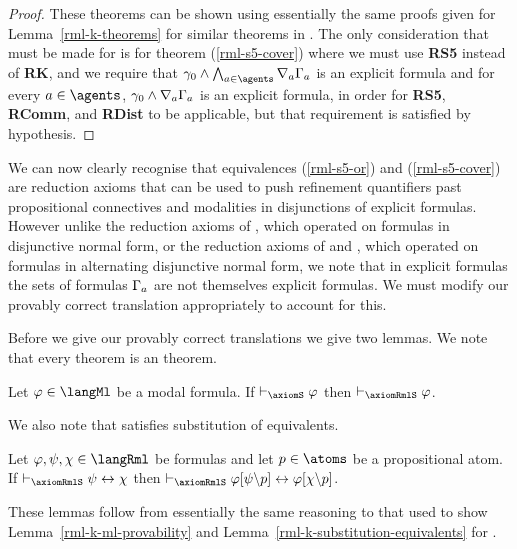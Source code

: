 \begin{proof}
These theorems can be shown using essentially the same proofs given for Lemma~\ref{rml-k-theorems} for similar theorems in \axiomRmlK{}.
The only consideration that must be made for \axiomRmlS{} is for theorem (\ref{rml-s5-cover}) where we must use {\bf RS5} instead of {\bf RK}, 
and we require that $\gamma_0 \land \bigwedge_{\agentA \in \agents} \coversA \Gamma_\agentA$ is an explicit formula and for every $\agentA \in \agents$, $\gamma_0 \land \nabla_{a} \Gamma_a$ is an explicit formula, in order for {\bf RS5}, {\bf RComm}, and {\bf RDist} to be applicable, but that requirement is satisfied by hypothesis.
\end{proof}

We can now clearly recognise that equivalences (\ref{rml-s5-or}) and (\ref{rml-s5-cover}) are reduction axioms that can be used to push refinement quantifiers past propositional connectives and modalities in disjunctions of explicit formulas.
However unlike the reduction axioms of \logicRmlK{}, which operated on formulas in disjunctive normal form, or the reduction axioms of \logicRmlKFF{} and \logicRmlKD{}, which operated on formulas in alternating disjunctive normal form, we note that in explicit formulas the sets of formulas $\Gamma_a$ are not themselves explicit formulas.
We must modify our provably correct translation appropriately to account for this.

Before we give our provably correct translations we give two lemmas.
We note that every \axiomS{} theorem is an \axiomRmlS{} theorem.

\begin{lemma}\label{rml-s5-ml-provability}
Let $\phi \in \langMl$ be a modal formula.
If $\proves_\axiomS \phi$ then $\proves_\axiomRmlS \phi$.
\end{lemma}

We also note that \axiomRmlS{} satisfies substitution of equivalents.

\begin{lemma}\label{rml-s5-substitution-equivalents}
Let $\phi, \psi, \chi \in \langRml$ be formulas and let $\atomP \in \atoms$ be a propositional atom.
If $\proves_\axiomRmlS \psi \iff \chi$ then $\proves_\axiomRmlS \phi[\psi\backslash\atomP] \iff \phi[\chi\backslash\atomP]$.
\end{lemma}

These lemmas follow from essentially the same reasoning to that used to show Lemma~\ref{rml-k-ml-provability} and Lemma~\ref{rml-k-substitution-equivalents} for \axiomRmlK{}.

